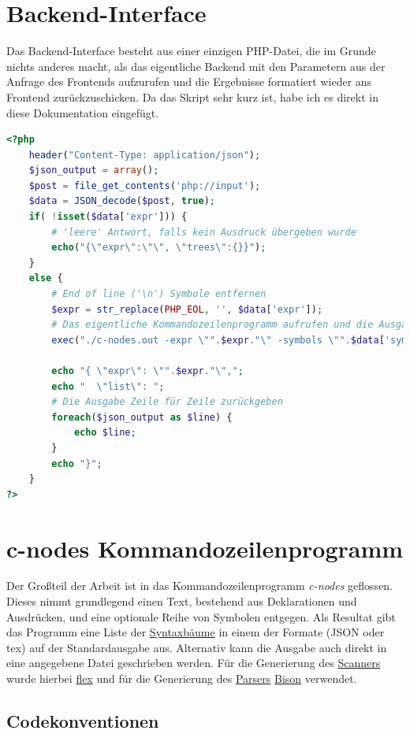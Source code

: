 \documentclass[oneside]{ausarbeitung}
\begin{document}
\section{Backend-Interface}
\label{sec:backend_interface}
Das Backend-Interface besteht aus einer einzigen PHP-Datei, die im Grunde nichts anderes macht, als das eigentliche Backend mit den Parametern aus der Anfrage des Frontends aufzurufen und die Ergebnisse formatiert wieder ans Frontend zurückzuschicken. Da das Skript sehr kurz ist, habe ich es direkt in diese Dokumentation eingefügt.


\begin{lstlisting}[language=PHP, label={lst:BackendInterface}, caption={Das gesamte Backend-Interface-Skript}]
<?php
	header("Content-Type: application/json");
	$json_output = array();
	$post = file_get_contents('php://input');
	$data = JSON_decode($post, true);
	if( !isset($data['expr'])) {
		# 'leere' Antwort, falls kein Ausdruck übergeben wurde
		echo("{\"expr\":\"\", \"trees\":{}}");
	}
	else {
		# End of line ('\n') Symbole entfernen
		$expr = str_replace(PHP_EOL, '', $data['expr']);
		# Das eigentliche Kommandozeilenprogramm aufrufen und die Ausgabe speichern
		exec("./c-nodes.out -expr \"".$expr."\" -symbols \"".$data['symbols']."\" -json", $json_output);

		echo "{ \"expr\": \"".$expr."\",";
		echo "  \"list\": ";
		# Die Ausgabe Zeile für Zeile zurückgeben
		foreach($json_output as $line) {
			echo $line;
		}
		echo "}";
	}
?>
\end{lstlisting}

\section{c-nodes Kommandozeilenprogramm}
\label{sec:backend}
Der Großteil der Arbeit ist in das Kommandozeilenprogramm \textit{c-nodes} geflossen. Dieses nimmt grundlegend einen Text, bestehend aus Deklarationen und Ausdrücken, und eine optionale Reihe von Symbolen entgegen. Als Resultat gibt das Programm eine Liste der \hyperref[sub:syntax_tree]{Syntaxbäume} in einem der Formate (JSON oder tex) auf der Standardausgabe aus. Alternativ kann die Ausgabe auch direkt in eine angegebene Datei geschrieben werden. Für die Generierung des \hyperref[sub:scanner]{Scanners} wurde hierbei \hyperref[sub:flex]{flex} und für die Generierung des \hyperref[sub:parser]{Parsers} \hyperref[sub:bison]{Bison} verwendet.


\subsection{Codekonventionen}
\label{sub:code_conventions}
\end{document}
